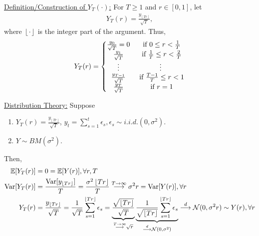 \documentclass[11pt]{elegantbook}
\begin{document}
\underline{Definition/Construction of $Y_T(\cdot)$:} For $T\geq 1$ and $r\in[0,1]$, let
\begin{equation}
    \begin{aligned}
        Y_T(r)=\frac{y_{\left\lfloor Tr\right\rfloor}}{\sqrt{T}},
    \end{aligned}
    \nonumber
\end{equation}
where $\left\lfloor \cdot\right\rfloor$ is the integer part of the argument. Thus,
\begin{equation}
    \begin{aligned}
        Y_T(r)=
        \left\{\begin{matrix}
            \frac{y_0}{\sqrt{T}}=0& \textnormal{ if }0\leq r<\frac{1}{T}\\
            \frac{y_1}{\sqrt{T}}& \textnormal{ if }\frac{1}{T}\leq r<\frac{2}{T}\\
            \vdots& \vdots\\
            \frac{y_{T-1}}{\sqrt{T}}& \textnormal{ if }\frac{T-1}{T}\leq r<1\\
            \frac{y_T}{\sqrt{T}}& \textnormal{ if }r=1
        \end{matrix}\right.
    \end{aligned}
    \nonumber
\end{equation}


\underline{Distribution Theory:}
Suppose
\begin{enumerate}
    \item $Y_T(r)=\frac{y_{\left\lfloor Tr\right\rfloor}}{\sqrt{T}}$, $y_t=\sum_{s=1}^t\epsilon_s,\epsilon_s\sim i.i.d. (0,\sigma^2)$.
    \item $Y\sim BM(\sigma^2)$.
\end{enumerate}
Then,
\begin{equation}
    \begin{aligned}
        \mathbb{E}[Y_T(r)]&=0=\mathbb{E}[Y(r)],\forall r,T\\
        \textnormal{Var}[Y_T(r)]&=\frac{\textnormal{Var}[y_{\left\lfloor Tr\right\rfloor}]}{T}=\frac{\sigma^2\left\lfloor Tr\right\rfloor}{T} \stackrel{T \rightarrow \infty}{\longrightarrow} \sigma^2 r = \textnormal{Var}[Y(r)],\forall r\\
        Y_T(r)&=\frac{y_{\left\lfloor Tr\right\rfloor}}{\sqrt{T}}=\frac{1}{\sqrt{T}}\sum_{s=1}^{\left\lfloor Tr\right\rfloor}\epsilon_s=\underbrace{\frac{\sqrt{\left\lfloor Tr\right\rfloor}}{\sqrt{T}}}_{\stackrel{T \rightarrow \infty}{\longrightarrow} \sqrt{r}}\underbrace{\frac{1}{\sqrt{\left\lfloor Tr\right\rfloor}}\sum_{s=1}^{\left\lfloor Tr\right\rfloor}\epsilon_s}_{\stackrel{d}{\longrightarrow} \mathcal{N}(0,\sigma^2)}\stackrel{d}{\longrightarrow} \mathcal{N}(0,\sigma^2r)\sim Y(r),\forall r\\
    \end{aligned}
    \nonumber
\end{equation}
\end{document}
